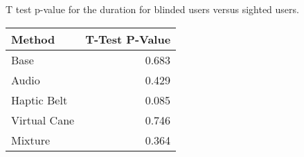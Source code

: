 
\centering
\caption{T test p-value for the duration for blinded users versus sighted users.}
\label{tab:ttest_duration}
\begin{tabular}{lr}
\toprule
      Method &  T-Test P-Value \\
\midrule
        Base &           0.683 \\
       Audio &           0.429 \\
 Haptic Belt &           0.085 \\
Virtual Cane &           0.746 \\
     Mixture &           0.364 \\
\bottomrule
\end{tabular}
